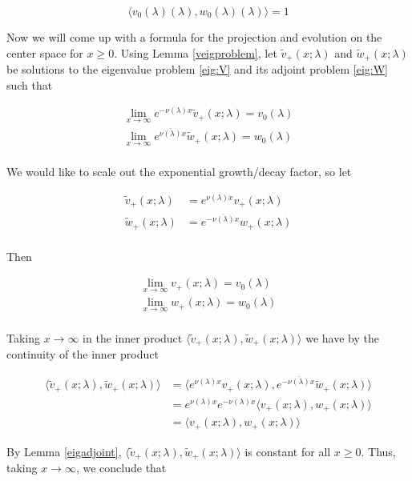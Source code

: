 \documentclass[12pt]{article}
\begin{document}
\[
\langle v_0(\lambda)(\lambda), w_0(\lambda)(\lambda) \rangle = 1
\]
 
Now we will come up with a formula for the projection and evolution on the center space for $x \geq 0$. Using Lemma \ref{veigproblem}, let $\tilde{v}_+(x; \lambda)$ and $\tilde{w}_+(x; \lambda)$ be solutions to the eigenvalue problem \eqref{eig:V} and its adjoint problem \eqref{eig:W} such that

\begin{align*}
\lim_{x \rightarrow \infty} e^{-\nu(\lambda) x} \tilde{v}_+(x; \lambda) = v_0(\lambda) \\
\lim_{x \rightarrow \infty} e^{\overline{\nu(\lambda)} x} \tilde{w}_+(x; \lambda) = w_0(\lambda) \\
\end{align*}

We would like to scale out the exponential growth/decay factor, so let

\begin{align*}
\tilde{v}_+(x; \lambda) &= e^{\nu(\lambda) x } v_+(x; \lambda) \\
\tilde{w}_+(x; \lambda) &= e^{-\overline{\nu(\lambda)} x } w_+(x; \lambda) \\
\end{align*}

Then

\begin{align*}
\lim_{x \rightarrow \infty} v_+(x; \lambda) = v_0(\lambda) \\
\lim_{x \rightarrow \infty} w_+(x; \lambda) = w_0(\lambda) \\
\end{align*}

Taking $x \rightarrow \infty$ in the inner product $\langle \tilde{v}_+(x; \lambda), \tilde{w}_+(x; \lambda) \rangle$ we have by the continuity of the inner product

\begin{align*}
\langle \tilde{v}_+(x; \lambda), \tilde{w}_+(x; \lambda) \rangle
&= \langle e^{\nu(\lambda) x } v_+(x; \lambda), e^{-\overline{\nu(\lambda)} x} \tilde{w}_+(x; \lambda) \rangle \\
&= e^{\nu(\lambda) x } e^{-\nu(\lambda) x } \langle v_+(x; \lambda), w_+(x; \lambda) \rangle \\
&= \langle v_+(x; \lambda), w_+(x; \lambda) \rangle
\end{align*}

By Lemma \ref{eigadjoint}, $\langle \tilde{v}_+(x; \lambda), \tilde{w}_+(x; \lambda) \rangle$ is constant for all $x \geq 0$. Thus, taking $x \rightarrow \infty$, we conclude that 
\end{document}
